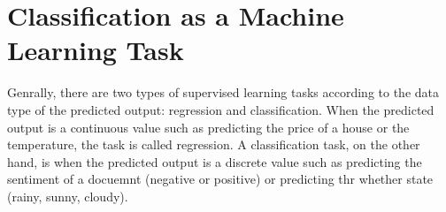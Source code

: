 %
%

\section{Classification as a Machine Learning Task}
Genrally, there are two types of supervised learning tasks according to the data type of the predicted output: regression and classification. When the predicted output is a continuous value such as predicting the price of a house or the temperature, the task is called regression. A classification task, on the other hand, is when the predicted output is a discrete value such as predicting the sentiment of a docuemnt (negative or positive) or predicting thr whether state (rainy, sunny, cloudy). 

